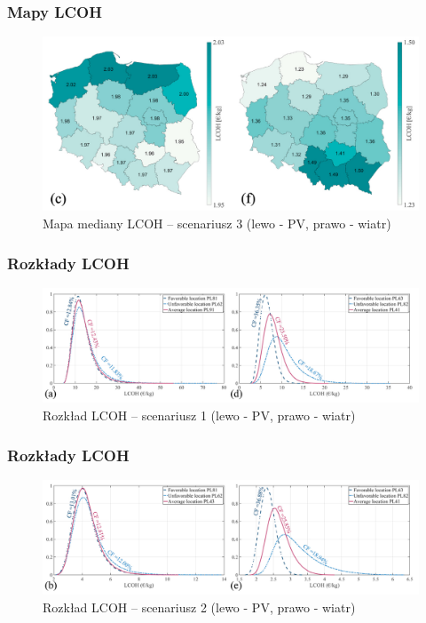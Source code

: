 \documentclass{beamer}
\begin{document}
\begin{frame}[noframenumbering]
	\frametitle{Mapy LCOH}
	\begin{figure}
		\begin{center}
			\includegraphics[width=\textwidth]{mmc-results-maps-3.png}
		\end{center}
		\caption{Mapa mediany LCOH -- scenariusz 3 (lewo - PV, prawo - wiatr)}
	\end{figure}
\end{frame}

\begin{frame}
	\frametitle{Rozkłady LCOH}
	\begin{figure}
		\begin{center}
			\includegraphics[width=\textwidth]{mmc-results-charts-1.png}
		\end{center}
		\caption{Rozkład LCOH -- scenariusz 1 (lewo - PV, prawo - wiatr)}
	\end{figure}
\end{frame}

\begin{frame}[noframenumbering]
	\frametitle{Rozkłady LCOH}
	\begin{figure}
		\begin{center}
			\includegraphics[width=\textwidth]{mmc-results-charts-2.png}
		\end{center}
		\caption{Rozkład LCOH -- scenariusz 2 (lewo - PV, prawo - wiatr)}
	\end{figure}
\end{frame}
\end{document}
